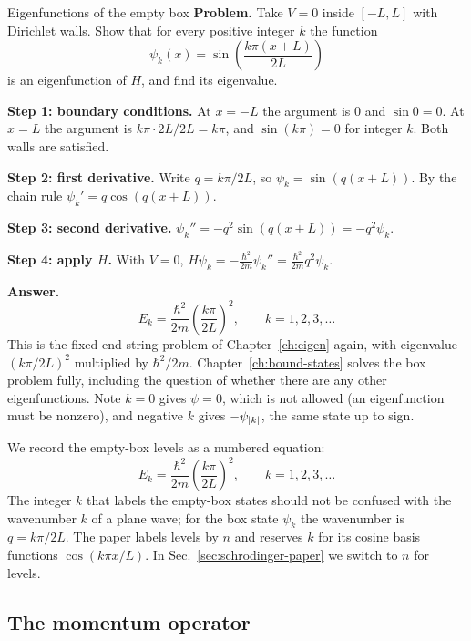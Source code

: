 \begin{sample}{Eigenfunctions of the empty box}
\textbf{Problem.} Take $V=0$ inside $[-L,L]$ with Dirichlet walls. Show that for every positive integer $k$ the function
\[
\psi_k(x)=\sin\!\left(\frac{k\pi(x+L)}{2L}\right)
\]
is an eigenfunction of $H$, and find its eigenvalue.

\textbf{Step 1: boundary conditions.} At $x=-L$ the argument is $0$ and $\sin0=0$. At $x=L$ the argument is $k\pi\cdot2L/2L=k\pi$, and $\sin(k\pi)=0$ for integer $k$. Both walls are satisfied.

\textbf{Step 2: first derivative.} Write $q=k\pi/2L$, so $\psi_k=\sin(q(x+L))$. By the chain rule $\psi_k'=q\cos(q(x+L))$.

\textbf{Step 3: second derivative.} $\psi_k''=-q^2\sin(q(x+L))=-q^2\psi_k$.

\textbf{Step 4: apply $H$.} With $V=0$, $H\psi_k=-\frac{\hbar^2}{2m}\psi_k''=\frac{\hbar^2}{2m}q^2\psi_k$.

\textbf{Answer.}
\[
\boxed{E_k=\frac{\hbar^2}{2m}\left(\frac{k\pi}{2L}\right)^2,\qquad k=1,2,3,\dots}
\]
This is the fixed-end string problem of Chapter~\ref{ch:eigen} again, with eigenvalue $(k\pi/2L)^2$ multiplied by $\hbar^2/2m$. Chapter~\ref{ch:bound-states} solves the box problem fully, including the question of whether there are any other eigenfunctions. Note $k=0$ gives $\psi=0$, which is not allowed (an eigenfunction must be nonzero), and negative $k$ gives $-\psi_{\left\lvert k\right\rvert}$, the same state up to sign.
\end{sample}

We record the empty-box levels as a numbered equation:
\begin{equation}
E_k=\frac{\hbar^2}{2m}\left(\frac{k\pi}{2L}\right)^2,\qquad k=1,2,3,\dots
\label{eq:schrodinger-box-levels}
\end{equation}
The integer $k$ that labels the empty-box states should not be confused with the wavenumber $k$ of a plane wave; for the box state $\psi_k$ the wavenumber is $q=k\pi/2L$. The paper labels levels by $n$ and reserves $k$ for its cosine basis functions $\cos(k\pi x/L)$. In Sec.~\ref{sec:schrodinger-paper} we switch to $n$ for levels.

\subsection{The momentum operator}


